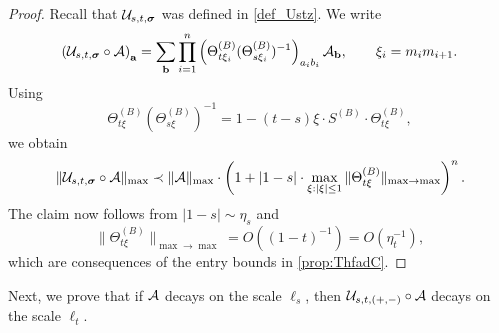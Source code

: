 \documentclass[10pt,reqno]{article}
\theoremstyle{plain} %
\theoremstyle{remark}
\numberwithin{equation}{section}
\begin{document}
\begin{proof} 
Recall that ${\cal U}_{s,t,\boldsymbol{\sigma}}$ was defined in \ref{def_Ustz}. We write  
\[
\left({\cal U}_{s,t,\boldsymbol{\sigma}}\circ {\cal A} \right)_{\textbf{a}}
=\sum_{\textbf{b}} \prod_{i=1}^n
\left(\Theta^{(B)}_{t\xi_i }(\Theta^{(B)}_{s \xi_i})^{-1}\right)_{a_i b_i}
{\cal A}_{\textbf{b}},
\qquad
\xi_i=m_i m_{i+1}.
\]
Using
\[
 \Theta^{(B)}_{t \xi }(\Theta^{(B)}_{s  \xi})^{-1}
 =
 1-(t-s)\xi\cdot S^{(B)}\cdot \Theta_{t\xi}^{(B)},
\]
we obtain
\[
\| {\cal U}_{s,t,\boldsymbol{\sigma}}\circ {\cal A}\|_{\max }
\prec
\|{\cal A}\|_{\max}\cdot
\left(
1+|1-s|\cdot
\max_{\xi: |\xi|\le 1}
\|\Theta^{(B)}_{t\xi}\|_{\max\to\max}
\right)^n .
\]
The claim now follows from $|1-s|\sim \eta_s$ and
\[
\|\Theta^{(B)}_{t\xi}\|_{\max\to\max}=O((1-t)^{-1})=O(\eta_t^{-1}),
\]
which are consequences of the entry bounds in \eqref{prop:ThfadC}.
\end{proof} 





Next, we prove that if $\cal A $ decays on the scale $\ell_s$, then ${\cal U}_{s,t, (+,-)}\circ \cal A$ decays on the scale $\ell_t$. 
\end{document}
